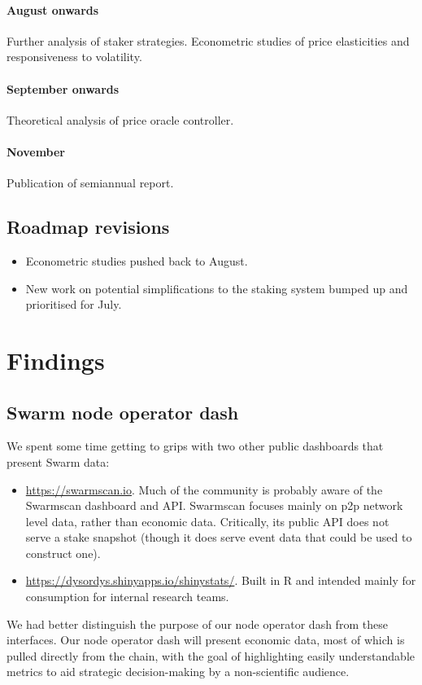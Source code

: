 \paragraph{August onwards}
%
Further analysis of staker strategies.
%
Econometric studies of price elasticities and responsiveness to volatility.

\paragraph{September onwards}
%
Theoretical analysis of price oracle controller.

\paragraph{November}
%
Publication of semiannual report.


\subsection*{Roadmap revisions}

\begin{itemize}
  \item Econometric studies pushed back to August.
  \item New work on potential simplifications to the staking system bumped up and prioritised for July.
\end{itemize}



\section*{Findings}

\subsection*{Swarm node operator dash}

We spent some time getting to grips with two other public dashboards that present Swarm data:
%
\begin{itemize}
  \item \url{https://swarmscan.io}. Much of the community is probably aware of the Swarmscan dashboard and API. 
  Swarmscan focuses mainly on p2p network level data, rather than economic data.
  Critically, its public API does not serve a stake snapshot (though it does serve event data that could be used to construct one).

  \item \url{https://dysordys.shinyapps.io/shinystats/}. Built in R and intended mainly for consumption for internal research teams.
\end{itemize}
%
We had better distinguish the purpose of our node operator dash from these interfaces.
%
Our node operator dash will present economic data, most of which is pulled directly from the chain, with the goal of highlighting easily understandable metrics to aid strategic decision-making by a non-scientific audience.

